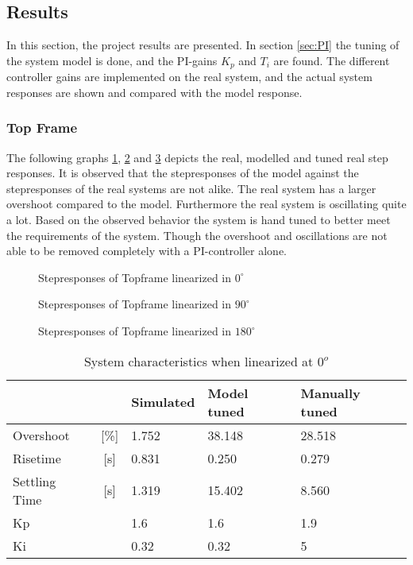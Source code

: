 \documentclass[../../Main]{subfiles}
\begin{document}
\subsection{Results}
\label{sec:results}
In this section, the project results are presented. In section \ref{sec:PI} the tuning of the system model is done, and the PI-gains $K_p$ and $T_i$ are found. The different controller gains are implemented on the real system, and the actual system responses are shown and compared
with the model response.

\subsubsection{Top Frame}
\label{sec:top_frame_results}

The following graphs \ref{fig:top_0}, \ref{fig:top_90} and \ref{fig:top_180} depicts the real, modelled and tuned real step responses.
It is observed that the stepresponses of the model against the stepresponses of the real
systems are not alike. The real system has a larger overshoot compared to the model.
Furthermore the real system is oscillating quite a lot. Based on the observed behavior
the system is hand tuned to better meet the requirements of the system. Though the
overshoot and oscillations are not able to be removed completely with a PI-controller
alone.


\begin{figure}[H]
  \def\svgwidth{\textwidth}
  
  \caption{Stepresponses of Topframe linearized in $0^{\circ}$}
  \label{fig:top_0}
\end{figure}


\begin{figure}[H]	
  \def\svgwidth{\textwidth}
  
  \caption{Stepresponses of Topframe linearized in $90^{\circ}$}
  \label{fig:top_90}
\end{figure}

\begin{figure}[H]
  \def\svgwidth{\textwidth}
  
  \caption{Stepresponses of Topframe linearized in $180^{\circ}$}
  \label{fig:top_180}
\end{figure}



\begin{table}[H]
	\centering
	\begin{tabular}{lc|*{3}{l}}
		&&Simulated&Model tuned&Manually tuned\\
		\hline
		Overshoot&[\%] &1.752&38.148&28.518\\
		Risetime&[\si{s}]&0.831&0.250&0.279\\
		Settling Time&[\si{s}]&1.319&15.402&8.560\\
		Kp&&1.6&1.6&1.9\\
		Ki&&0.32&0.32&5
	\end{tabular}
	\caption{System characteristics when linearized at $0^o$}
	\label{tab:0_top}
\end{table}
\end{document}
